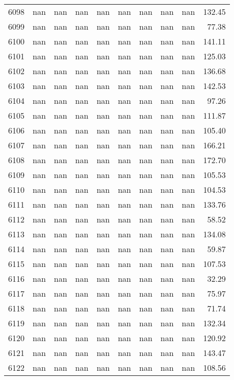 \begin{tabular}{lrrrrrrrrr}
6098 & nan & nan & nan & nan & nan & nan & nan & nan & 132.45 \\
6099 & nan & nan & nan & nan & nan & nan & nan & nan & 77.38 \\
6100 & nan & nan & nan & nan & nan & nan & nan & nan & 141.11 \\
6101 & nan & nan & nan & nan & nan & nan & nan & nan & 125.03 \\
6102 & nan & nan & nan & nan & nan & nan & nan & nan & 136.68 \\
6103 & nan & nan & nan & nan & nan & nan & nan & nan & 142.53 \\
6104 & nan & nan & nan & nan & nan & nan & nan & nan & 97.26 \\
6105 & nan & nan & nan & nan & nan & nan & nan & nan & 111.87 \\
6106 & nan & nan & nan & nan & nan & nan & nan & nan & 105.40 \\
6107 & nan & nan & nan & nan & nan & nan & nan & nan & 166.21 \\
6108 & nan & nan & nan & nan & nan & nan & nan & nan & 172.70 \\
6109 & nan & nan & nan & nan & nan & nan & nan & nan & 105.53 \\
6110 & nan & nan & nan & nan & nan & nan & nan & nan & 104.53 \\
6111 & nan & nan & nan & nan & nan & nan & nan & nan & 133.76 \\
6112 & nan & nan & nan & nan & nan & nan & nan & nan & 58.52 \\
6113 & nan & nan & nan & nan & nan & nan & nan & nan & 134.08 \\
6114 & nan & nan & nan & nan & nan & nan & nan & nan & 59.87 \\
6115 & nan & nan & nan & nan & nan & nan & nan & nan & 107.53 \\
6116 & nan & nan & nan & nan & nan & nan & nan & nan & 32.29 \\
6117 & nan & nan & nan & nan & nan & nan & nan & nan & 75.97 \\
6118 & nan & nan & nan & nan & nan & nan & nan & nan & 71.74 \\
6119 & nan & nan & nan & nan & nan & nan & nan & nan & 132.34 \\
6120 & nan & nan & nan & nan & nan & nan & nan & nan & 120.92 \\
6121 & nan & nan & nan & nan & nan & nan & nan & nan & 143.47 \\
6122 & nan & nan & nan & nan & nan & nan & nan & nan & 108.56 \\

\end{tabular}
